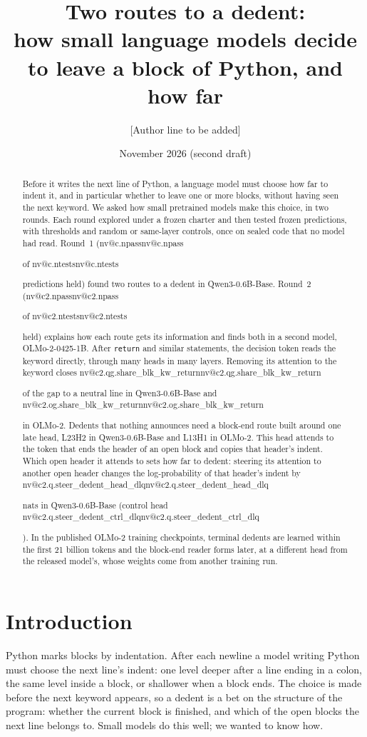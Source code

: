 \documentclass[11pt]{article}
\title{\textbf{Two routes to a dedent:\\ how small language models decide to leave a block of Python, and how far}}
\author{[Author line to be added]}
\date{\vspace{-1.5em}November 2026 (second draft)}
\makeatletter
\newcommand{\nv}[1]{\ifcsname nv@#1\endcsname\csname nv@#1\endcsname\else\PackageError{numbers}{Unknown number key #1}{}\fi}
\newcommand{\qw}{Qwen3-0.6B-Base}
\newcommand{\hd}[2]{L#1H#2}
\newcommand{\code}[1]{\texttt{#1}}
\makeatother
\begin{document}
\maketitle
\vspace{-2em}

\begin{abstract}
\noindent
Before it writes the next line of Python, a language model must choose how far to indent it, and in particular whether to leave one or more blocks, without having seen the next keyword. We asked how small pretrained models make this choice, in two rounds. Each round explored under a frozen charter and then tested frozen predictions, with thresholds and random or same-layer controls, once on sealed code that no model had read. Round~1 (\nv{c.npass} of \nv{c.ntests} predictions held) found two routes to a dedent in \qw{}. Round~2 (\nv{c2.npass} of \nv{c2.ntests} held) explains how each route gets its information and finds both in a second model, OLMo-2-0425-1B. After \code{return} and similar statements, the decision token reads the keyword directly, through many heads in many layers. Removing its attention to the keyword closes \nv{c2.qg.share_blk_kw_return} of the gap to a neutral line in \qw{} and \nv{c2.og.share_blk_kw_return} in OLMo-2. Dedents that nothing announces need a block-end route built around one late head, \hd{23}{2} in \qw{} and \hd{13}{1} in OLMo-2. This head attends to the token that ends the header of an open block and copies that header's indent. Which open header it attends to sets how far to dedent: steering its attention to another open header changes the log-probability of that header's indent by \nv{c2.q.steer_dedent_head_dlq} nats in \qw{} (control head \nv{c2.q.steer_dedent_ctrl_dlq}). In the published OLMo-2 training checkpoints, terminal dedents are learned within the first 21 billion tokens and the block-end reader forms later, at a different head from the released model's, whose weights come from another training run.
\end{abstract}

\section{Introduction}
\label{sec:intro}

Python marks blocks by indentation. After each newline a model writing Python must choose the next line's indent: one level deeper after a line ending in a colon, the same level inside a block, or shallower when a block ends. The choice is made before the next keyword appears, so a dedent is a bet on the structure of the program: whether the current block is finished, and which of the open blocks the next line belongs to. Small models do this well; we wanted to know how.
\end{document}
